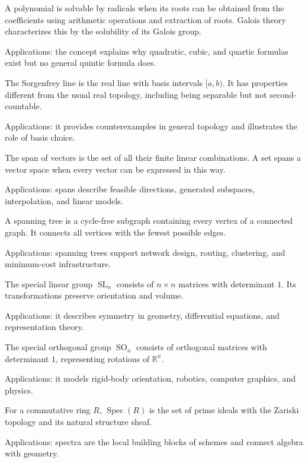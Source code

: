 A polynomial is solvable by radicals when its roots can be obtained from the coefficients using arithmetic operations and extraction of roots. Galois theory characterizes this by the solubility of its Galois group. \par\noindent Applications: the concept explains why quadratic, cubic, and quartic formulas exist but no general quintic formula does.

The Sorgenfrey line is the real line with basis intervals $[a,b)$. It has properties different from the usual real topology, including being separable but not second-countable. \par\noindent Applications: it provides counterexamples in general topology and illustrates the role of basis choice.

The span of vectors is the set of all their finite linear combinations. A set spans a vector space when every vector can be expressed in this way. \par\noindent Applications: spans describe feasible directions, generated subspaces, interpolation, and linear models.

A spanning tree is a cycle-free subgraph containing every vertex of a connected graph. It connects all vertices with the fewest possible edges. \par\noindent Applications: spanning trees support network design, routing, clustering, and minimum-cost infrastructure.

The special linear group $\operatorname{SL}_n$ consists of $n\times n$ matrices with determinant $1$. Its transformations preserve orientation and volume. \par\noindent Applications: it describes symmetry in geometry, differential equations, and representation theory.

The special orthogonal group $\operatorname{SO}_n$ consists of orthogonal matrices with determinant $1$, representing rotations of $\mathbb R^n$. \par\noindent Applications: it models rigid-body orientation, robotics, computer graphics, and physics.

For a commutative ring $R$, $\operatorname{Spec}(R)$ is the set of prime ideals with the Zariski topology and its natural structure sheaf. \par\noindent Applications: spectra are the local building blocks of schemes and connect algebra with geometry.

